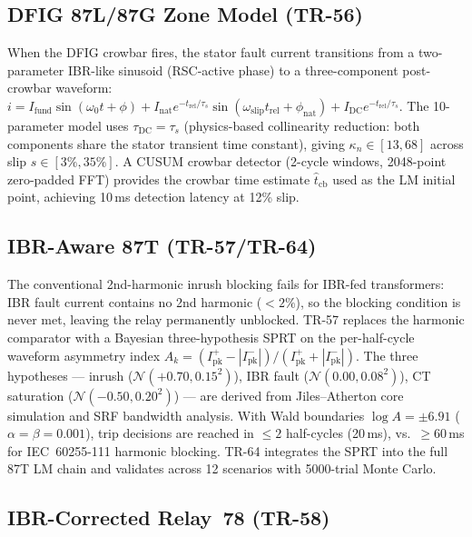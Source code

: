 \documentclass[journal,twoside,10pt]{IEEEtran}
\begin{document}
\subsection{DFIG 87L/87G Zone Model (TR-56)}
\label{sec:ibr:dfig}

When the DFIG crowbar fires, the stator fault current transitions from a
two-parameter IBR-like sinusoid (RSC-active phase) to a three-component
post-crowbar waveform:
$i = I_{\mathrm{fund}}\sin(\omega_0 t + \phi)
     + I_{\mathrm{nat}}e^{-t_{\mathrm{rel}}/\tau_s}\sin(\omega_{\mathrm{slip}}t_{\mathrm{rel}}+\phi_{\mathrm{nat}})
     + I_{\mathrm{DC}}e^{-t_{\mathrm{rel}}/\tau_s}$.
The 10-parameter model uses $\tau_{\mathrm{DC}} = \tau_s$ (physics-based
collinearity reduction: both components share the stator transient time
constant), giving $\kappa_n \in [13, 68]$ across slip $s \in [3\%, 35\%]$.
A CUSUM crowbar detector (2-cycle windows, 2048-point zero-padded FFT)
provides the crowbar time estimate $\hat{t}_{\mathrm{cb}}$ used as the
LM initial point, achieving 10\,ms detection latency at 12\% slip.

\subsection{IBR-Aware 87T (TR-57/TR-64)}
\label{sec:ibr:87t}

The conventional 2nd-harmonic inrush blocking fails for IBR-fed
transformers: IBR fault current contains no 2nd harmonic ($< 2\%$),
so the blocking condition is never met, leaving the relay permanently
unblocked.
TR-57 replaces the harmonic comparator with a Bayesian three-hypothesis
SPRT on the per-half-cycle waveform asymmetry index
$A_k = (I^+_{\mathrm{pk}} - |I^-_{\mathrm{pk}}|)/(I^+_{\mathrm{pk}} + |I^-_{\mathrm{pk}}|)$.
The three hypotheses --- inrush ($\mathcal{N}(+0.70, 0.15^2)$), IBR fault
($\mathcal{N}(0.00, 0.08^2)$), CT saturation ($\mathcal{N}(-0.50, 0.20^2)$)
--- are derived from Jiles--Atherton core simulation and SRF bandwidth
analysis.
With Wald boundaries $\log A = \pm 6.91$ ($\alpha = \beta = 0.001$),
trip decisions are reached in $\leq 2$ half-cycles (20\,ms), vs.\ $\geq
60$\,ms for IEC~60255-111 harmonic blocking.
TR-64 integrates the SPRT into the full 87T LM chain and validates
across 12 scenarios with 5000-trial Monte Carlo.

\subsection{IBR-Corrected Relay~78 (TR-58)}
\label{sec:ibr:relay78}
\end{document}

